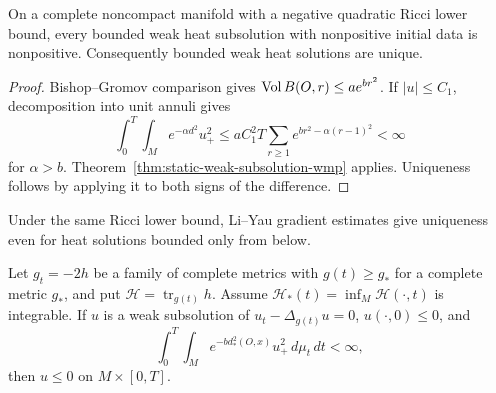 \begin{corollary}
\label{cor:bounded-weak-subsolution-wmp}
On a complete noncompact manifold with a negative quadratic Ricci lower
bound, every bounded weak heat subsolution with nonpositive initial data is
nonpositive.  Consequently bounded weak heat solutions are unique.
\end{corollary}

\begin{proof}
Bishop--Gromov comparison gives $\operatorname{Vol} B(O,r)\leq ae^{br^2}$.  If $|u|\leq C_1$,
decomposition into unit
annuli gives
\[
\int_0^T\!\int_M e^{-\alpha d^2}u_+^2
\leq aC_1^2T\sum_{r\geq1}e^{br^2-\alpha(r-1)^2}<\infty
\]
for $\alpha>b$.  Theorem~\ref{thm:static-weak-subsolution-wmp} applies.
Uniqueness follows by applying it to both signs of the difference.
\end{proof}

\begin{remark}
\label{rem:li-yau-below-bounded-uniqueness}
Under the same Ricci lower bound, Li--Yau gradient estimates give uniqueness
even for heat solutions bounded only from below.
\end{remark}

\begin{theorem}
\label{thm:evolving-metric-weak-subsolution-wmp}
Let $g_t=-2h$ be a family of complete metrics with $g(t)\geq g_*$ for a
complete metric $g_*$, and put $\mathcal H=\operatorname{tr}_{g(t)}h$.  Assume
$\mathcal H_*(t)=\inf_M\mathcal H(\cdot,t)$ is integrable.  If $u$ is a weak
subsolution of $u_t-\Delta_{g(t)}u=0$, $u(\cdot,0)\leq0$, and
\[
\int_0^T\!\int_Me^{-bd_*^2(O,x)}u_+^2\,d\mu_t\,dt<\infty,
\]
then $u\leq0$ on $M\times[0,T]$.
\end{theorem}


